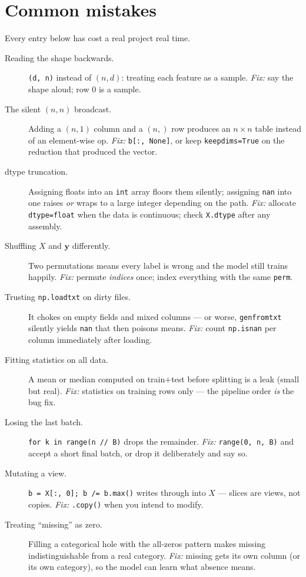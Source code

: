 \section{Common mistakes}\label{sec:mistakes}

Every entry below has cost a real project real time.

\begin{description}
\item[Reading the shape backwards.] \texttt{(d, n)} instead of $(n, d)$:
  treating each feature as a sample. \emph{Fix:} say the shape aloud; row 0 is
  a sample.
\item[The silent $(n,n)$ broadcast.] Adding a $(n,1)$ column and a $(n,)$ row
  produces an $n\times n$ table instead of an element-wise op. \emph{Fix:}
  \texttt{b[:, None]}, or keep \texttt{keepdims=True} on the reduction that
  produced the vector.
\item[dtype truncation.] Assigning floats into an \texttt{int} array floors
  them silently; assigning \texttt{nan} into one raises \emph{or} wraps to a
  large integer depending on the path. \emph{Fix:} allocate
  \texttt{dtype=float} when the data is continuous; check
  \texttt{X.dtype} after any assembly.
\item[Shuffling $X$ and $\mathbf y$ differently.] Two permutations means every
  label is wrong and the model still trains happily. \emph{Fix:} permute
  \emph{indices} once; index everything with the same \texttt{perm}.
\item[Trusting \texttt{np.loadtxt} on dirty files.] It chokes on empty
  fields and mixed columns --- or worse, \texttt{genfromtxt} silently yields
  \texttt{nan} that then poisons means. \emph{Fix:} count \texttt{np.isnan}
  per column immediately after loading.
\item[Fitting statistics on all data.] A mean or median computed on
  train$+$test before splitting is a leak (small but real). \emph{Fix:}
  statistics on training rows only --- the pipeline order \emph{is} the bug
  fix.
\item[Losing the last batch.] \texttt{for k in range(n // B)} drops the
  remainder. \emph{Fix:} \texttt{range(0, n, B)} and accept a short final
  batch, or drop it deliberately and say so.
\item[Mutating a view.] \texttt{b = X[:, 0]; b /= b.max()} writes through into
  $X$ --- slices are views, not copies. \emph{Fix:} \texttt{.copy()} when you
  intend to modify.
\item[Treating ``missing'' as zero.] Filling a categorical hole with the
  all-zeros pattern makes missing indistinguishable from a real category.
  \emph{Fix:} missing gets its own column (or its own category), so the model
  can learn what absence means.
\end{description}


